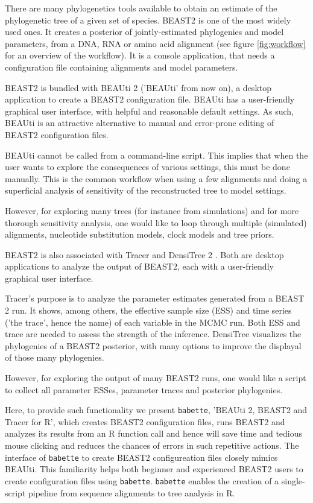 \documentclass{article}
\begin{document}
There are many phylogenetics tools available to obtain an estimate 
of the phylogenetic tree of a given set of species. 
BEAST2 \cite{bouckaert2014beast} is one of the most widely used ones. 
It creates a posterior of jointly-estimated phylogenies and model parameters, 
from a DNA, RNA or amino acid alignment (see figure \ref{fig:workflow} 
for an overview of the workflow). 
It is a console application, that needs a configuration file containing 
alignments and model parameters.

BEAST2 is bundled with BEAUti 2 \cite{drummond2012bayesian} ('BEAUti' from now on), 
a desktop application to create a BEAST2 configuration file.
BEAUti has a user-friendly graphical user interface, with helpful and 
reasonable default settings.
As such, BEAUti is an attractive alternative 
to manual and error-prone editing of BEAST2 configuration files. 

BEAUti cannot be called from a command-line script.
This implies that when the user 
wants to explore the consequences of various settings, this must be done manually.
This is the common workflow when using a few alignments and doing a superficial 
analysis of sensitivity of the reconstructed tree to model settings. 

However, for exploring many trees (for instance from simulations) and for
more thorough sensitivity analysis, one would like to loop through 
multiple (simulated) alignments, nucleotide substitution models, 
clock models and tree priors. 

BEAST2 is also associated with Tracer \cite{tracer} and 
DensiTree 2 \cite{DensiTree}. Both are desktop applications 
to analyze the output of BEAST2, each with a user-friendly graphical user interface. 

Tracer's purpose is to analyze the parameter estimates generated
from a BEAST 2 run. It shows, among
others, the effective sample size (ESS) and time series ('the trace', 
hence the name) of each variable in the MCMC run. Both ESS and trace
are needed to assess the strength of the inference. 
DensiTree visualizes the phylogenies of a BEAST2 posterior, with
many options to improve the displayal of those many phylogenies.

However, for exploring the output of many BEAST2 runs, 
one would like a script to collect all parameter ESSes,
parameter traces and posterior phylogenies. 

Here, to provide such functionality we present \verb;babette;, 
’BEAUti 2, BEAST2 and Tracer for R’, 
which creates BEAST2 configuration files,
runs BEAST2 and analyzes its results 
from an R function call and hence
will save time and tedious mouse clicking and 
reduces the chances of errors in such repetitive actions.
The interface of \verb;babette; to create BEAST2 configureation
files closely mimics BEAUti. This
familiarity helps both beginner and experienced BEAST2 users 
to create configuration files using \verb;babette;.
\verb;babette; enables the creation of a single-script 
pipeline from sequence alignments to tree analysis in R. 
\end{document}

